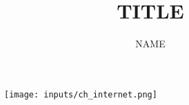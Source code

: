 \documentclass[10pt]{article}
\title{TITLE}
\author{NAME}
\begin{document}
\maketitle  

\begin{figure}[htpb]
    \texttt{[image: inputs/ch\_internet.png]}
\end{figure}
\end{document}
